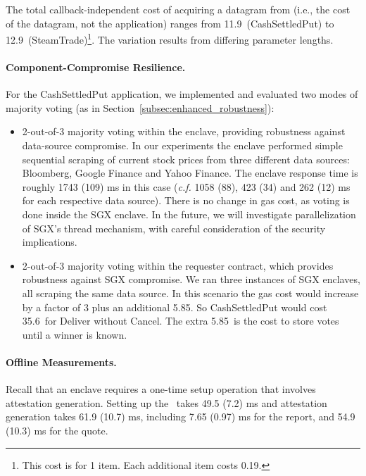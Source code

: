 The total callback-independent cost of acquiring a datagram from \tc (i.e., the cost of the datagram, not the application)
ranges from 11.9\textcent\ ({\sf CashSettledPut}) to 12.9\textcent\ ({\sf SteamTrade})\footnote{This cost is for 1 item. Each additional item costs 0.19\textcent.}.
The variation results from differing parameter lengths.





\paragraph{Component-Compromise Resilience.}
\label{subsec:hedging}
For the {\sf CashSettledPut} application, 
we implemented and evaluated two modes of majority voting (as in Section~\ref{subsec:enhanced_robustness}):
\begin{itemize}[leftmargin=3mm]
  \setlength{\itemsep}{2pt}
  \setlength{\parskip}{0pt}
  \setlength{\parsep}{0pt}
\item
2-out-of-3 majority voting within the enclave, providing robustness
against data-source compromise. 
In our experiments
the enclave performed simple sequential scraping of current stock prices 
from three different data sources: Bloomberg, Google Finance and Yahoo Finance.
The enclave response time is roughly
1743 (109) ms in this case ({\it c.f.}  
1058 (88), 423 (34) and 262 (12) ms for 
each respective data source). There is no change in gas cost, as voting is done
inside the SGX enclave.
In the future, we will investigate parallelization of SGX's thread mechanism, with careful consideration of the security implications.


\item
2-out-of-3 majority voting within the requester contract,
which provides robustness against 
SGX compromise.
We ran three instances of SGX enclaves, all scraping
the same data source.  
In this scenario 
the gas cost would increase by a factor of 3 plus an additional 5.85\textcent.
So {\sf CashSettledPut} would cost 35.6\textcent\ for Deliver without Cancel.
The extra 5.85\textcent\ is the cost to store votes until a winner is known.
\end{itemize}


\paragraph{Offline Measurements.}
Recall that an enclave requires a one-time setup operation that involves attestation generation.
Setting up the \tc\ \encname takes
49.5 (7.2) ms
and attestation generation takes 
61.9 (10.7) ms, including
7.65 (0.97) ms for the report, 
and 54.9 (10.3) ms for the quote.

